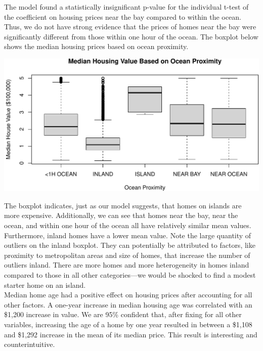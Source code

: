 \documentclass{article}
\begin{document}
The model found a statistically insignificant p-value for the individual t-test of the coefficient on housing prices near the bay compared to within the ocean. Thus, we do not have strong evidence that the prices of homes near the bay were significantly different from those within one hour of the ocean. The boxplot below shows the median housing prices based on ocean proximity. 

\hfill

\begin{center}
    \includegraphics[scale = 0.75]{Median Housing Value (Ocean Proximity).pdf}
\end{center}

\hfill

The boxplot indicates, just as our model suggests, that homes on islands are more expensive. Additionally, we can see that homes near the bay, near the ocean, and within one hour of the ocean all have relatively similar mean values.  Furthermore, inland homes have a lower mean value. Note the large quantity of outliers on the inland boxplot. They can potentially be attributed to factors, like proximity to metropolitan areas and size of homes, that increase the number of outliers inland. There are more homes and more heterogeneity in homes inland compared to those in all other categories—we would be shocked to find a modest starter home on an island. \\

Median home age had a positive effect on housing prices after accounting for all other factors. A one-year increase in median housing age was correlated with an \$1,200 increase in value. We are 95\% confident that, after fixing for all other variables, increasing the age of a home by one year resulted in between a \$1,108 and \$1,292 increase in the mean of its median price. This result is interesting and counterintuitive. \\
\end{document}
